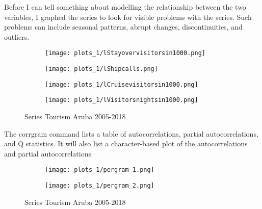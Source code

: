 \documentclass[11pt]{article}
\begin{document}
Before I can tell something about modelling the relationship between the two variables, I graphed the series to look for visible problems with the series. Such problems can include seasonal patterns, abrupt changes, discontinuities, and outliers. 
\begin{figure}[h!]
    \centering
    \begin{subfigure}[t]{0.45\textwidth}
         \texttt{[image: plots\_1/lStayovervisitorsin1000.png]}
    \end{subfigure}
    \begin{subfigure}[t]{0.45\textwidth}
          \texttt{[image: plots\_1/lShipcalls.png]}
    \end{subfigure}
    \begin{subfigure}[b]{0.45\textwidth}
          \texttt{[image: plots\_1/lCruisevisitorsin1000.png]}
    \end{subfigure}
        \begin{subfigure}[b]{0.45\textwidth}
        \texttt{[image: plots\_1/lVisitorsnightsin1000.png]}
    \end{subfigure}
    \caption{Series Tourism Aruba 2005-2018}
    \label{fig:originalseries}
\end{figure}


The corrgram command lists a table of autocorrelations, partial autocorrelations,
and Q statistics. It will also list a character-based plot of the autocorrelations and
partial autocorrelations


\begin{figure}[h!]
    \centering
    \begin{subfigure}[t]{0.45\textwidth}
         \texttt{[image: plots\_1/pergram\_1.png]}
    \end{subfigure}
    \begin{subfigure}[t]{0.45\textwidth}
          \texttt{[image: plots\_1/pergram\_2.png]}
    \end{subfigure}
    \caption{Series Tourism Aruba 2005-2018}
    \label{fig:pergrams}
\end{figure}
\end{document}
